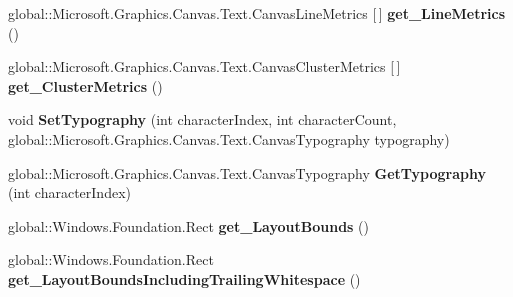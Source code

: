 \begin{DoxyCompactItemize}
\item 
\mbox{\label{class_microsoft_1_1_graphics_1_1_canvas_1_1_text_1_1_canvas_text_layout_aeb404118734ea91e7bee88ebc313cec1}} 
global\+::\+Microsoft.\+Graphics.\+Canvas.\+Text.\+Canvas\+Line\+Metrics \mbox{[}$\,$\mbox{]} {\bfseries get\+\_\+\+Line\+Metrics} ()
\item 
\mbox{\label{class_microsoft_1_1_graphics_1_1_canvas_1_1_text_1_1_canvas_text_layout_a0d448b366382895fac2e94fc9b2358dd}} 
global\+::\+Microsoft.\+Graphics.\+Canvas.\+Text.\+Canvas\+Cluster\+Metrics \mbox{[}$\,$\mbox{]} {\bfseries get\+\_\+\+Cluster\+Metrics} ()
\item 
\mbox{\label{class_microsoft_1_1_graphics_1_1_canvas_1_1_text_1_1_canvas_text_layout_aae0bff9344ddf4205aab37ecf0fdb8f4}} 
void {\bfseries Set\+Typography} (int character\+Index, int character\+Count, global\+::\+Microsoft.\+Graphics.\+Canvas.\+Text.\+Canvas\+Typography typography)
\item 
\mbox{\label{class_microsoft_1_1_graphics_1_1_canvas_1_1_text_1_1_canvas_text_layout_aa9de23a3678c4be132aa53e6409d9777}} 
global\+::\+Microsoft.\+Graphics.\+Canvas.\+Text.\+Canvas\+Typography {\bfseries Get\+Typography} (int character\+Index)
\item 
\mbox{\label{class_microsoft_1_1_graphics_1_1_canvas_1_1_text_1_1_canvas_text_layout_a772111b2573293b7d5a75e8d2396d598}} 
global\+::\+Windows.\+Foundation.\+Rect {\bfseries get\+\_\+\+Layout\+Bounds} ()
\item 
\mbox{\label{class_microsoft_1_1_graphics_1_1_canvas_1_1_text_1_1_canvas_text_layout_abce87ca208bfa0993ebbf52d11a81671}} 
global\+::\+Windows.\+Foundation.\+Rect {\bfseries get\+\_\+\+Layout\+Bounds\+Including\+Trailing\+Whitespace} ()
\item 
\mbox{\label{class_microsoft_1_1_graphics_1_1_canvas_1_1_text_1_1_canvas_text_layout_ada71c45dac02cdac6f56799104455aa5}} 

\end{DoxyCompactItemize}
